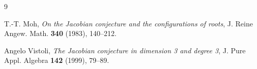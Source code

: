 \documentclass[11pt]{article}
\theoremstyle{remark}
\begin{document}
\begin{thebibliography}{9}

T.-T. Moh,
\emph{On the Jacobian conjecture and the configurations of roots},
J. Reine Angew. Math. \textbf{340} (1983), 140--212.

Angelo Vistoli,
\emph{The Jacobian conjecture in dimension 3 and degree 3},
J. Pure Appl. Algebra \textbf{142} (1999), 79--89.

\end{thebibliography}
\end{document}
